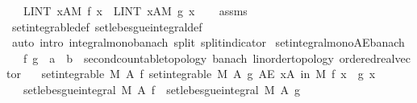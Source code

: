 \begin{isabellebody}
\ \ \ {\isachardoublequoteopen}{\isacharparenleft}{\kern0pt}LINT\ x{\isacharcolon}{\kern0pt}A{\isacharbar}{\kern0pt}M{\isachardot}{\kern0pt}\ f\ x{\isacharparenright}{\kern0pt}\ {\isasymle}\ {\isacharparenleft}{\kern0pt}LINT\ x{\isacharcolon}{\kern0pt}A{\isacharbar}{\kern0pt}M{\isachardot}{\kern0pt}\ g\ x{\isacharparenright}{\kern0pt}{\isachardoublequoteclose}\isanewline
%
\isadelimproof
\ \ %
\endisadelimproof
%
\isatagproof
{}\isamarkupfalse%
\ assms\ \isamarkupfalse%
\ set{\isacharunderscore}{\kern0pt}integrable{\isacharunderscore}{\kern0pt}def\ set{\isacharunderscore}{\kern0pt}lebesgue{\isacharunderscore}{\kern0pt}integral{\isacharunderscore}{\kern0pt}def\isanewline
\ \ \isamarkupfalse%
\ {\isacharparenleft}{\kern0pt}auto\ intro{\isacharcolon}{\kern0pt}\ integral{\isacharunderscore}{\kern0pt}mono{\isacharunderscore}{\kern0pt}banach\ split{\isacharcolon}{\kern0pt}\ split{\isacharunderscore}{\kern0pt}indicator{\isacharparenright}{\kern0pt}%
\endisatagproof
{\isafoldproof}%
%
\isadelimproof
\isanewline
%
\endisadelimproof
\isanewline
{}\isamarkupfalse%
\ set{\isacharunderscore}{\kern0pt}integral{\isacharunderscore}{\kern0pt}mono{\isacharunderscore}{\kern0pt}AE{\isacharunderscore}{\kern0pt}banach{\isacharcolon}{\kern0pt}\isanewline
\ \ \ f\ g\ {\isacharcolon}{\kern0pt}{\isacharcolon}{\kern0pt}\ {\isachardoublequoteopen}{\isacharprime}{\kern0pt}a\ {\isasymRightarrow}\ {\isacharprime}{\kern0pt}b\ {\isacharcolon}{\kern0pt}{\isacharcolon}{\kern0pt}\ {\isacharbraceleft}{\kern0pt}second{\isacharunderscore}{\kern0pt}countable{\isacharunderscore}{\kern0pt}topology{\isacharcomma}{\kern0pt}\ banach{\isacharcomma}{\kern0pt}\ linorder{\isacharunderscore}{\kern0pt}topology{\isacharcomma}{\kern0pt}\ ordered{\isacharunderscore}{\kern0pt}real{\isacharunderscore}{\kern0pt}vector{\isacharbraceright}{\kern0pt}{\isachardoublequoteclose}\isanewline
\ \ \ {\isachardoublequoteopen}set{\isacharunderscore}{\kern0pt}integrable\ M\ A\ f{\isachardoublequoteclose}\ {\isachardoublequoteopen}set{\isacharunderscore}{\kern0pt}integrable\ M\ A\ g{\isachardoublequoteclose}\ {\isachardoublequoteopen}AE\ x{\isasymin}A\ in\ M{\isachardot}{\kern0pt}\ f\ x\ {\isasymle}\ g\ x{\isachardoublequoteclose}\isanewline
\ \ \ {\isachardoublequoteopen}set{\isacharunderscore}{\kern0pt}lebesgue{\isacharunderscore}{\kern0pt}integral\ M\ A\ f\ {\isasymle}\ set{\isacharunderscore}{\kern0pt}lebesgue{\isacharunderscore}{\kern0pt}integral\ M\ A\ g{\isachardoublequoteclose}%

\end{isabellebody}

